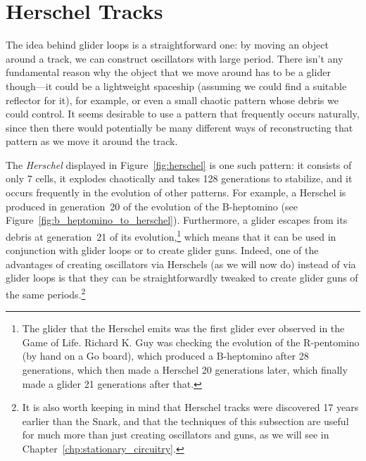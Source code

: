 
\section{Herschel Tracks}\label{sec:herschel_track}

The idea behind glider loops is a straightforward one: by moving an object around a track, we can construct oscillators with large period. There isn't any fundamental reason why the object that we move around has to be a glider though---it could be a lightweight spaceship (assuming we could find a suitable reflector for it), for example, or even a small chaotic pattern whose debris we could control. It seems desirable to use a pattern that frequently occurs naturally, since then there would potentially be many different ways of reconstructing that pattern as we move it around the track.

The \emph{Herschel} displayed in Figure~\ref{fig:herschel} is one such pattern: it consists of only 7 cells, it explodes chaotically and takes 128 generations to stabilize, and it occurs frequently in the evolution of other patterns. For example, a Herschel is produced in generation~20 of the evolution of the B-heptomino (see Figure~\ref{fig:b_heptomino_to_herschel}). Furthermore, a glider escapes from its debris at generation~21 of its evolution,\footnote{The glider that the Herschel emits was the first glider ever observed in the Game of Life. Richard K. Guy was checking the evolution of the R-pentomino (by hand on a Go board), which produced a B-heptomino after 28 generations, which then made a Herschel 20 generations later, which finally made a glider 21 generations after that.} which means that it can be used in conjunction with glider loops or to create glider guns. Indeed, one of the advantages of creating oscillators via Herschels (as we will now do) instead of via glider loops is that they can be straightforwardly tweaked to create glider guns of the same periods.\footnote{It is also worth keeping in mind that Herschel tracks were discovered 17 years earlier than the Snark, and that the techniques of this subsection are useful for much more than just creating oscillators and guns, as we will see in Chapter~\ref{chp:stationary_circuitry}.}


